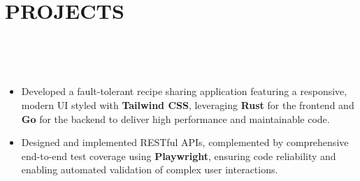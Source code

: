 \documentclass[12pt,letterpaper,roman]{moderncv}
\makeatletter
\def \scaleFont {1.00} %
\def \headingSpace {-8mm * \real{\scaleFont}} %
\def \scaleHeadings {1.15}
\def \itemSpacing {-4mm}
\newcommand*{\customcvproject}[4][.25em]{
  \begin{tabular}{@{}l}
    {\relscale{\scaleHeadings}\bfseries #2}
  \end{tabular}
  \hfill%
  \begin{tabular}{l@{}}
     {\textcolor{blue}{#3}}
  \end{tabular}\\[-5.5mm]
  \ifx&#4&
  \else{\\
    \begin{minipage}{\maincolumnwidth}
      \small#4
    \end{minipage}}\fi
  \par\addvspace{#1}\leavevmode \\[0mm]}
\makeatother
\begin{document}
\section{PROJECTS} \leavevmode \\[\headingSpace]
{~\\[-22mm]
{\begin{itemize} \relscale{\scaleFont}
	\item Developed a fault-tolerant recipe sharing application featuring a responsive, modern UI styled with \textbf{Tailwind CSS}, leveraging \textbf{Rust} for the frontend and \textbf{Go} for the backend to deliver high performance and maintainable code.~\\[\itemSpacing]
	\item Designed and implemented RESTful APIs, complemented by comprehensive end-to-end test coverage using \textbf{Playwright}, ensuring code reliability and enabling automated validation of complex user interactions.
\end{itemize}
}
~\\[-15mm]

}
\end{document}
